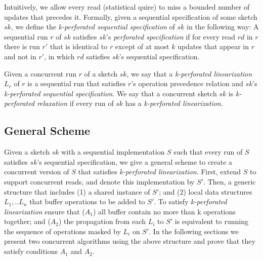 Intuitively, we allow every read (statistical quire) to miss
a bounded number of updates that precedes it.
Formally, given a sequential specification of some sketch
$sk$, we define the \emph{k-perforated sequential specification}
of $sk$ in the following way:
A sequential run $r$ of $sk$ satisfies $sk$'s \emph{perforated
specification} if for every read $rd$ in $r$ there is run $r'$
that is identical to $r$ except of at most $k$ updates
that appear in $r$ and not in $r'$, in which $rd$ satisfies
$sk$'s sequential specification.

Given a concurrent run $r$ of a sketch $sk$, we say that a
\emph{k-perforated linearization} $L_r$ of $r$ is a
sequential run that satisfies $r$'s operation precedence
relation and $sk$'s \emph{k-perforated sequential specification}.
We say that a concurrent sketch $sk$ is \emph{k-perforated
relaxation} if every run of $sk$ has a \emph{k-perforated
linearization}.


\subsection{General Scheme}
\label{sub:generalScheme}




Given a sketch $sk$ with a sequential implementation $S$ such
that every run of $S$ satisfies $sk$'s sequential specification,
we give a general scheme to create a concurrent version of
$S$ that satisfies \emph{k-perforated linearization}.
First, extend $S$ to support concurrent reads, and denote this
implementation by $S'$.
Then, a generic structure that includes (1) a shared
instance of $S'$; and (2) local data structures $L_1,.. L_n$
that buffer operations to be added to $S'$.
To satisfy \emph{k-perforated linearization} ensure that ($A_1$)
all buffer contain no more than k operations together; and
($A_2$) the propagation from each $L_i$ to $S'$ is equivalent to
running the sequence of operations masked by $L_i$ on $S'$.
In the following sections we present two concurrent algorithms
using the above structure and prove that they satisfy conditions
$A_1$ and $A_2$.


